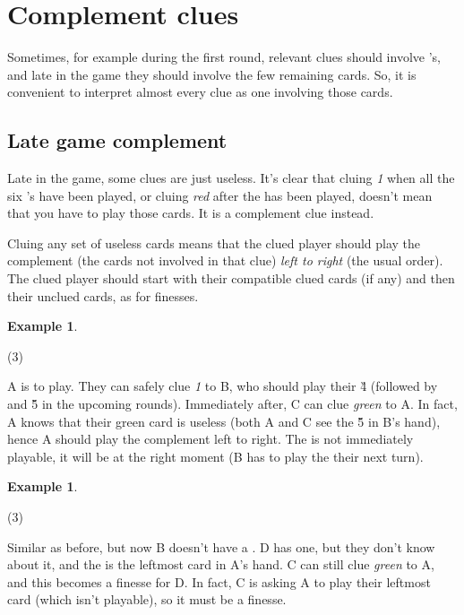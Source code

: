 \documentclass[a4paper]{article}
\theoremstyle{plain}
\theoremstyle{definition}
\newtheorem{example}[theorem]{Example}
\begin{document}
\section{Complement clues}

Sometimes, for example during the first round, relevant clues should involve 's, and late in the game they should involve the few remaining cards. So, it is convenient to interpret almost every clue as one involving those cards.

\subsection{Late game complement}

Late in the game, some clues are just useless. It's clear that cluing \textit{1} when all the six 's have been played, or cluing \textit{red} after the  has been played, doesn't mean that you have to play those cards. It is a complement clue instead.

Cluing any set of useless cards means that the clued player should play the complement (the cards not involved in that clue) \textit{left to right} (the usual order). The clued player should start with their compatible clued cards (if any) and then their unclued cards, as for finesses.

\begin{example}
	\hfill
	\begin{tasks}(3)
		\task[+]      
		\task[A]    
		\task[B]    
		\task[C]    
		\task[D]    
		\task[E]    
	\end{tasks}
	
	A is to play. They can safely clue \textit{1} to B, who should play their \G{4} (followed by  and \G{5} in the upcoming rounds). Immediately after, C can clue \textit{green} to A. In fact, A knows that their green card is useless (both A and C see the \G{5} in B's hand), hence A should play the complement left to right. The  is not immediately playable, it will be at the right moment (B has to play the  their next turn).
\end{example}

\begin{example}
	\hfill
	\begin{tasks}(3)
		\task[+]      
		\task[A]    
		\task[B]    
		\task[C]    
		\task[D]    
		\task[E]    
	\end{tasks}
	
	Similar as before, but now B doesn't have a . D has one, but they don't know about it, and the  is the leftmost card in A's hand. C can still clue \textit{green} to A, and this becomes a finesse for D. In fact, C is asking A to play their leftmost card (which isn't playable), so it must be a finesse.
\end{example}
\end{document}
